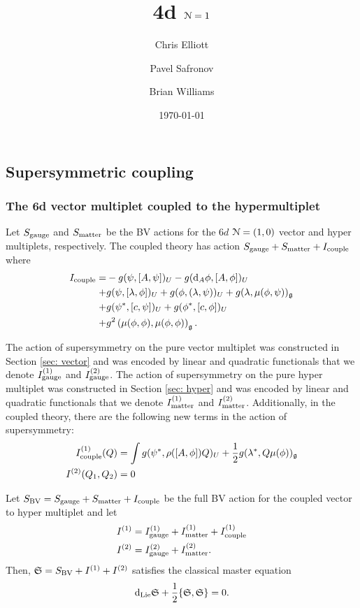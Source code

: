 \documentclass[10pt, oneside]{article}
\title{4d $\mathcal N=1$}
\author{Chris Elliott\and Pavel Safronov \and Brian Williams}
\date{\today}
\begin{document}
\maketitle

\subsection{Supersymmetric coupling}
\subsubsection{The 6d vector multiplet coupled to the hypermultiplet}

Let $S_{\rm gauge}$ and $S_{\rm matter}$ be the BV actions for the $6d$ $\mathcal N=(1,0)$ vector and hyper multiplets, respectively. 
The coupled theory has action $S_{\rm gauge} + S_{\rm matter} + I_{\rm couple}$ where
\begin{align*}
I_{\rm couple} = & - g (\psi, [A, \psi])_U - g ({\rm d}_{A} \phi, [A,\phi])_U \\ + & g (\psi, [\lambda, \phi])_U + g (\phi, (\lambda, \psi))_U + g (\lambda, \mu(\phi, \psi))_\mathfrak g \\ + & g (\psi^*, [c, \psi])_U + g (\phi^*, [c, \phi])_U \\ + & g^2 \left(\mu(\phi, \phi), \mu(\phi, \phi) \right)_\mathfrak g .
\end{align*}

The action of supersymmetry on the pure vector multiplet was constructed in Section \ref{sec: vector} and was encoded by linear and quadratic functionals that we denote $I^{(1)}_{\rm gauge}$ and $I^{(2)}_{\rm gauge}$. 
The action of supersymmetry on the pure hyper multiplet was constructed in Section \ref{sec: hyper} and was encoded by linear and quadratic functionals that we denote $I^{(1)}_{\rm matter}$ and $I^{(2)}_{\rm matter}$. 
Additionally, in the coupled theory, there are the following new terms in the action of supersymmetry:
\begin{align*}
I^{(1)}_{\rm couple} (Q) & = \int g (\psi^*, \rho([A, \phi]) Q)_U + \frac{1}{2} g (\lambda^*, Q \mu(\phi))_\mathfrak g \\
I^{(2)} (Q_1 , Q_2) & = 0 
\end{align*}

\begin{thm}
Let $S_{\rm BV} = S_{\rm gauge} + S_{\rm matter} + I_{\rm couple}$ be the full BV action for the coupled vector to hyper multiplet and let
\begin{align*}
I^{(1)} & = I^{(1)}_{\rm gauge} + I^{(1)}_{\rm matter} + I^{(1)}_{\rm couple} \\
I^{(2)} & = I^{(2)}_{\rm gauge} + I^{(2)}_{\rm matter} .
\end{align*}
Then, $\mathfrak S = S_{\rm BV} + I^{(1)} + I^{(2)}$ satisfies the classical master equation
\begin{equation}\label{CMEcouple}
{\rm d}_{\rm Lie} \mathfrak S + \frac{1}{2} \{\mathfrak S, \mathfrak S\} = 0 .
\end{equation}
\end{thm}
\end{document}
